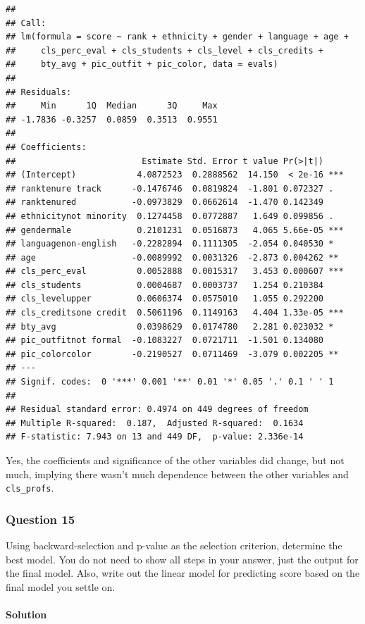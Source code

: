 \documentclass[]{article}
\let\oldparagraph\paragraph
\renewcommand{\paragraph}[1]{\oldparagraph{#1}\mbox{}}
\begin{document}
\begin{verbatim}
## 
## Call:
## lm(formula = score ~ rank + ethnicity + gender + language + age + 
##     cls_perc_eval + cls_students + cls_level + cls_credits + 
##     bty_avg + pic_outfit + pic_color, data = evals)
## 
## Residuals:
##     Min      1Q  Median      3Q     Max 
## -1.7836 -0.3257  0.0859  0.3513  0.9551 
## 
## Coefficients:
##                         Estimate Std. Error t value Pr(>|t|)    
## (Intercept)            4.0872523  0.2888562  14.150  < 2e-16 ***
## ranktenure track      -0.1476746  0.0819824  -1.801 0.072327 .  
## ranktenured           -0.0973829  0.0662614  -1.470 0.142349    
## ethnicitynot minority  0.1274458  0.0772887   1.649 0.099856 .  
## gendermale             0.2101231  0.0516873   4.065 5.66e-05 ***
## languagenon-english   -0.2282894  0.1111305  -2.054 0.040530 *  
## age                   -0.0089992  0.0031326  -2.873 0.004262 ** 
## cls_perc_eval          0.0052888  0.0015317   3.453 0.000607 ***
## cls_students           0.0004687  0.0003737   1.254 0.210384    
## cls_levelupper         0.0606374  0.0575010   1.055 0.292200    
## cls_creditsone credit  0.5061196  0.1149163   4.404 1.33e-05 ***
## bty_avg                0.0398629  0.0174780   2.281 0.023032 *  
## pic_outfitnot formal  -0.1083227  0.0721711  -1.501 0.134080    
## pic_colorcolor        -0.2190527  0.0711469  -3.079 0.002205 ** 
## ---
## Signif. codes:  0 '***' 0.001 '**' 0.01 '*' 0.05 '.' 0.1 ' ' 1
## 
## Residual standard error: 0.4974 on 449 degrees of freedom
## Multiple R-squared:  0.187,  Adjusted R-squared:  0.1634 
## F-statistic: 7.943 on 13 and 449 DF,  p-value: 2.336e-14
\end{verbatim}

Yes, the coefficients and significance of the other variables did
change, but not much, implying there wasn't much dependence between the
other variables and \texttt{cls\_profs}.

\subsubsection{Question 15}\label{question-15}

Using backward-selection and p-value as the selection criterion,
determine the best model. You do not need to show all steps in your
answer, just the output for the final model. Also, write out the linear
model for predicting score based on the final model you settle on.

\paragraph{Solution}\label{solution-14}
\end{document}
